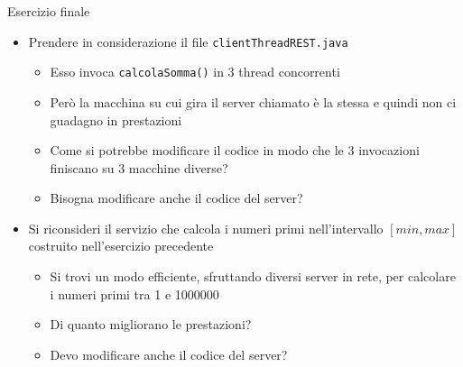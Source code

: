 \documentclass[11pt]{article}
\begin{document}
\begin{tcolorbox}[colback=blue!5!white,colframe=blue!75!black,title=\textbf{DOMANDA}, breakable]
Esercizio finale
\begin{itemize}
    \item Prendere in considerazione il file \texttt{clientThreadREST.java}
    \begin{itemize}
        \item Esso invoca \texttt{calcolaSomma()} in 3 thread concorrenti
        \item Però la macchina su cui gira il server chiamato è la stessa e quindi non ci guadagno in prestazioni
        \item Come si potrebbe modificare il codice in modo che le 3 invocazioni finiscano su 3 macchine diverse?
        \item Bisogna modificare anche il codice del server?
    \end{itemize}
    \item Si riconsideri il servizio che calcola i numeri primi nell'intervallo $[min, max]$ costruito nell'esercizio precedente
    \begin{itemize}
        \item Si trovi un modo efficiente, sfruttando diversi server in rete, per calcolare i numeri primi tra 1 e 1000000
        \item Di quanto migliorano le prestazioni?
        \item Devo modificare anche il codice del server?
    \end{itemize}
\end{itemize}
\end{tcolorbox}
\end{document}
